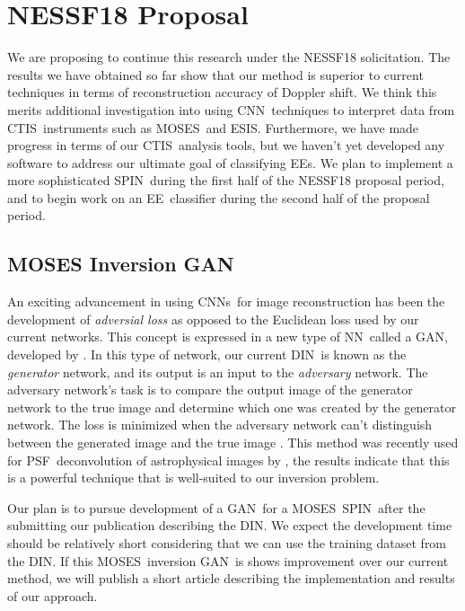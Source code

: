 \documentclass[10pt,letterpaper]{article}
\newcommand{\EE}{\ac{EE}}
\newcommand{\EEs}{\acp{EE}}
\newcommand{\CTIS}{\ac{CTIS}}
\newcommand{\MOSES}{\ac{MOSES}}
\newcommand{\ESIS}{\ac{ESIS}}
\newcommand{\NN}{\ac{NN}}
\newcommand{\CNN}{\ac{CNN}}
\newcommand{\CNNs}{\acp{CNN}}
\newcommand{\DIN}{\ac{DIN}}
\newcommand{\SPIN}{\ac{SPIN}}
\newcommand{\GAN}{\ac{GAN}}
\newcommand{\PSF}{\ac{PSF}}
\begin{document}
	\section{NESSF18 Proposal}
	
		We are proposing to continue this research under the NESSF18 solicitation.
		The results we have obtained so far show that our method is superior to current techniques in terms of reconstruction accuracy of Doppler shift.
		We think this merits additional investigation into using \CNN\ techniques to interpret data from \CTIS\ instruments such as \MOSES\ and \ESIS.
		Furthermore, we have made progress in terms of our \CTIS\ analysis tools, but we haven't yet developed any software to address our ultimate goal of classifying \EEs.
		We plan to implement a more sophisticated \SPIN\ during the first half of the NESSF18 proposal period, and to begin work on an \EE\ classifier during the second half of the proposal period.
	
		\subsection{MOSES Inversion GAN} \label{sec_gan}
		
			An exciting advancement in using \CNNs\ for image reconstruction has been the development of \textit{adversial loss} as opposed to the Euclidean loss used by our current networks. 
			This concept is expressed in a new type of \NN\ called a \GAN, developed by \cite{Goodfellow2014}. 
			In this type of network, our current \DIN\ is known as the \textit{generator} network, and its output is an input to the \textit{adversary} network. 
			The adversary network's task is to compare the output image of the generator network to the true image and determine which one was created by the generator network.
			The loss is minimized when the adversary network can't distinguish between the generated image and the true image \cite{Isola2016}.
			This method was recently used for \PSF\ deconvolution of astrophysical images by \cite{Schawinski2017}, the results indicate that this is a powerful technique that is well-suited to our inversion problem.
			
			Our plan is to pursue development of a \GAN\ for a \MOSES\ \SPIN\ after the submitting our publication describing the \DIN.
			We expect the development time should be relatively short considering that we can use the training dataset from the \DIN.
			If this \MOSES\ inversion \GAN\ is shows improvement over our current method, we will publish a short article describing the implementation and results of our approach.
			
\end{document}
